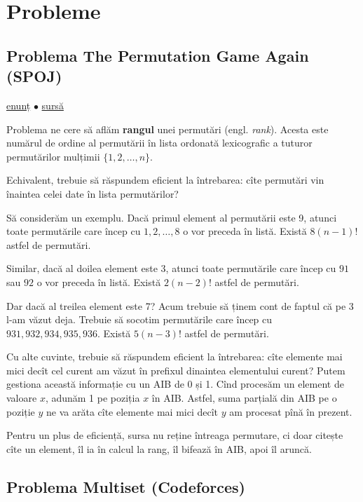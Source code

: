 \documentclass[../main.tex]{subfiles}
\begin{document}
\section{Probleme}

\subsection{Problema The Permutation Game Again (SPOJ)}
\label{problem:the-permutation-game-again}

\href{https://www.spoj.com/problems/TPGA/}{enunț}
$\bullet$
\hyperref[code:the-permutation-game-again]{sursă}

Problema ne cere să aflăm \textbf{rangul} unei permutări (engl. \textit{rank}). Acesta este numărul de ordine al permutării în lista ordonată lexicografic a tuturor permutărilor mulțimii $\{1, 2, \dots, n\}$.

Echivalent, trebuie să răspundem eficient la întrebarea: cîte permutări vin înaintea celei date în lista permutărilor?

Să considerăm un exemplu. Dacă primul element al permutării este 9, atunci toate permutările care încep cu $1, 2, \dots, 8$ o vor preceda în listă. Există $8(n-1)!$ astfel de permutări.

Similar, dacă al doilea element este 3, atunci toate permutările care încep cu $91$ sau $92$ o vor preceda în listă. Există $2(n-2)!$ astfel de permutări.

Dar dacă al treilea element este 7? Acum trebuie să ținem cont de faptul că pe 3 l-am văzut deja. Trebuie să socotim permutările care încep cu $931, 932, 934, 935, 936$. Există $5(n-3)!$ astfel de permutări.

Cu alte cuvinte, trebuie să răspundem eficient la întrebarea: cîte elemente mai mici decît cel curent am văzut în prefixul dinaintea elementului curent? Putem gestiona această informație cu un AIB de 0 și 1. Cînd procesăm un element de valoare $x$, adunăm 1 pe poziția $x$ în AIB. Astfel, suma parțială din AIB pe o poziție $y$ ne va arăta cîte elemente mai mici decît $y$ am procesat pînă în prezent.

Pentru un plus de eficiență, sursa nu reține întreaga permutare, ci doar citește cîte un element, îl ia în calcul la rang, îl bifează în AIB, apoi îl aruncă.

\subsection{Problema Multiset (Codeforces)}
\label{problem:multiset}
\end{document}
